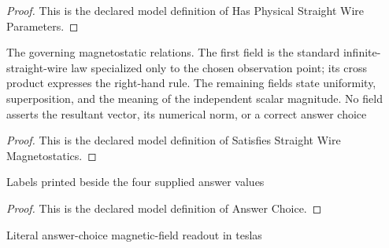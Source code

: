 \begin{proof}
  This is the declared model definition of Has Physical Straight Wire Parameters.
\end{proof}
\begin{definition}
  \label{def:physics:phyx-mini-0962:phyxminiproblems-problemphyxmini0962-satisfiesstraightwiremagnetostatics}
  The governing magnetostatic relations. The first field is the standard infinite-straight-wire law specialized only to the chosen observation point; its cross product expresses the right-hand rule. The remaining fields state uniformity, superposition, and the meaning of the independent scalar magnitude. No field asserts the resultant vector, its numerical norm, or a correct answer choice
\end{definition}
\begin{proof}
  This is the declared model definition of Satisfies Straight Wire Magnetostatics.
\end{proof}
\begin{definition}
  \label{def:physics:phyx-mini-0962:phyxminiproblems-problemphyxmini0962-answerchoice}
  Labels printed beside the four supplied answer values
\end{definition}
\begin{proof}
  This is the declared model definition of Answer Choice.
\end{proof}
\begin{definition}
  \label{def:physics:phyx-mini-0962:phyxminiproblems-problemphyxmini0962-displayedfieldmagnitudeinteslas}
  Literal answer-choice magnetic-field readout in teslas
\end{definition}
